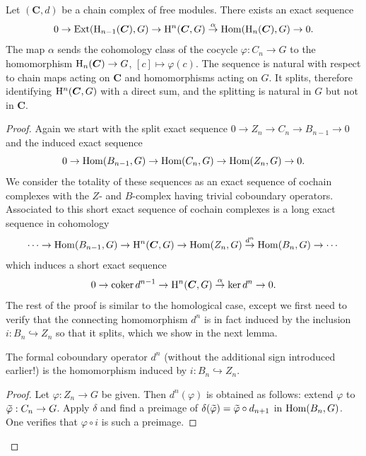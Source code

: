 \begin{prop}\label{prop 11.9.2 tomDieck}
    Let $(\bm{C},d)$ be a chain complex of free modules. There exists an exact sequence
    \[0\to \operatorname{Ext}(\mathrm{H}_{n-1}(\boldsymbol{C}),G)\to \mathrm{H}^n(\boldsymbol{C},G)\overset{\alpha}{\to}\operatorname{Hom}(\mathrm{H}_n(\boldsymbol{C}),G)\to 0.\]
    The map $\alpha$ sends the cohomology class of the cocycle $\varphi:C_n\to G$ to the homomorphism $\mathrm{H}_n(\boldsymbol{C})\to G$, $[c]\mapsto \varphi(c)$. The sequence is natural with respect to chain maps acting on $\bm{C}$ and homomorphisms acting on $G$. It splits, therefore identifying $\mathrm{H}^n(\boldsymbol{C},G)$ with a direct sum, and the splitting is natural in $G$ but not in $\bm{C}$. 
\end{prop}
\begin{proof}
    Again we start with the split exact sequence $0\to Z_n\to C_n\to B_{n-1}\to 0$ and the induced exact sequence
    \[0\to \operatorname{Hom}(B_{n-1},G)\to \operatorname{Hom}(C_n,G)\to \operatorname{Hom}(Z_n,G)\to 0.\]
    We consider the totality of these sequences as an exact sequence of cochain complexes with the $Z$- and $B$-complex having trivial coboundary operators. Associated to this short exact sequence of cochain complexes is a long exact sequence in cohomology
    \[\cdots\to \operatorname{Hom}(B_{n-1},G)\to \mathrm{H}^n(\boldsymbol{C},G)\to \operatorname{Hom}(Z_n,G)\overset{d^n}{\to}\operatorname{Hom}(B_n,G)\to \cdots\]
    which induces a short exact sequence
    \[0\to \operatorname{coker} d^{n-1}\to \mathrm{H}^n(\boldsymbol{C},G)\overset{\alpha}{\to }\ker d^n\to 0.\]
    The rest of the proof is similar to the homological case, except we first need to verify that the connecting homomorphism $d^n$ is in fact induced by the inclusion $i:B_n\hookrightarrow Z_n$ so that it splits, which we show in the next lemma.

    \begin{lem}\label{lem 11.9.3 tomDieck}
        The formal coboundary operator $d^n$ (without the additional sign introduced earlier!) is the homomorphism induced by $i:B_n\hookrightarrow Z_n$.
    \end{lem}
    \begin{proof}
        Let $\varphi:Z_n\to G$ be given. Then $d^n(\varphi)$ is obtained as follows: extend $\varphi$ to $\wt{\varphi}:C_n\to G$. Apply $\delta$ and find a preimage of $\delta(\wt{\varphi})=\wt{\varphi}\circ d_{n+1}$ in $\operatorname{Hom}(B_n,G)$. One verifies that $\varphi\circ i$ is such a preimage.
    \end{proof}


\end{proof}
